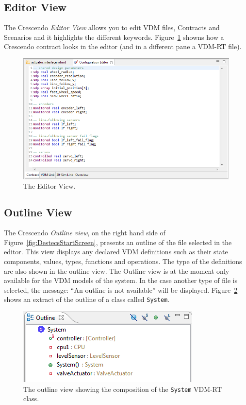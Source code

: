 \documentclass{crescendorepchap}
\begin{document}
\subsection{Editor View}\label{sec:editorview}

The Crescendo \emph{Editor View} allows you to edit VDM files, Contracts and Scenarios and it highlights the different keywords. Figure~\ref{fig:editorcontract1} showns how a Crescendo contract looks in the editor (and in a different pane a VDM-RT file).

\begin{figure}[htbp]
\centering
\includegraphics[width=.6\textwidth]{images/DestecsEditorNewContract.png}
\caption{The Editor View.\label{fig:editorcontract1}}
\end{figure}

\subsection{Outline View}

The Crescendo \emph{Outline view}, on the right hand side of Figure~\ref{fig:DestecsStartScreen}, presents
an outline of the file selected in the editor. This view displays any
declared VDM definitions such as their state components, values, types,
functions and operations. The type of the definitions are also shown in
the outline view. The Outline view is at the moment only available for
the VDM models of the system. In the case another type of file is
selected, the message: ``An outline is not available'' will be displayed. 
Figure~\ref{fig:outlineview} shows an extract of the outline of a class called \texttt{System}. 

\begin{figure}[htbp]
\centering
\includegraphics[width=.6\textwidth]{images/DestecsOutLineViewSystem.png}
\caption{The outline view showing the composition of the \texttt{System}
VDM-RT class.\label{fig:outlineview}}
\end{figure}
\end{document}
